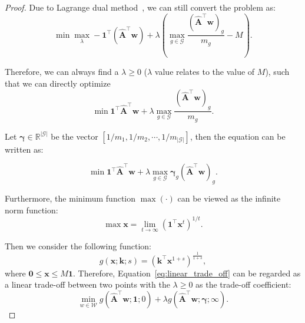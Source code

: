 \begin{proof}
    Due to Lagrange dual method~\citep{boct2008strong}, we can still convert the problem as:
     \begin{equation}
        \min \max_{\lambda} - \bm{1}^{\top}(\hat{\bm{A}}^{\top}\bm{w}) + \lambda (\max_{g\in\mathcal{G}} \frac{(\hat{\bm{A}}^{\top}\bm{w})_g}{m_g} - M).
    \end{equation}

    Therefore, we can always find a $\lambda \ge 0$ ($\lambda$ value relates to the value of $M$), such that we can directly optimize 
    \begin{equation}
        \min \bm{1}^{\top}\hat{\bm{A}}^{\top}\bm{w} + \lambda \max_{g\in\mathcal{G}} \frac{(\hat{\bm{A}}^{\top}\bm{w})_g}{m_g}.
    \end{equation}

    Let $\bm{\gamma}\in\mathbb{R}^{|\mathcal{G}|}$ be the vector $[1/m_1, 1/m_2, \cdots, 1/m_{|\mathcal{G}|}]$, then the equation can be written as:
    
    \begin{equation}\label{eq:linear_trade_off}
        \min \bm{1}^{\top}\hat{\bm{A}}^{\top}\bm{w} + \lambda \max_{g\in\mathcal{G}} \bm{\gamma}_g (\hat{\bm{A}}^{\top}\bm{w})_g.
    \end{equation}

   Furthermore, the minimum function $\max(\cdot)$ can be viewed as the infinite norm function:
    \[
        \max \bm{x} = \lim_{t \to \infty} (\bm{1}^{\top} \bm{x}^t)^{1/t}.
    \]

    Then we consider the following function:
    \[
        g(\bm{x}; \bm{k}; s)= (\bm{k}^{\top} \bm{x}^{1+s})^{\frac{1}{1+s}},
    \]
    where $\bm{0} \leq \bm{x} \leq M\bm{1}$. Therefore, Equation~\eqref{eq:linear_trade_off} can be regarded as a linear trade-off between two points with the $\lambda \ge 0$ as the trade-off coefficient:
    \[
       \min_{w\in\mathcal{W}} g(\hat{\bm{A}}^{\top}\bm{w}; \bm{1}; 0) + \lambda g(\hat{\bm{A}}^{\top}\bm{w}; \bm{\gamma} ;\infty).
    \]


\end{proof}
